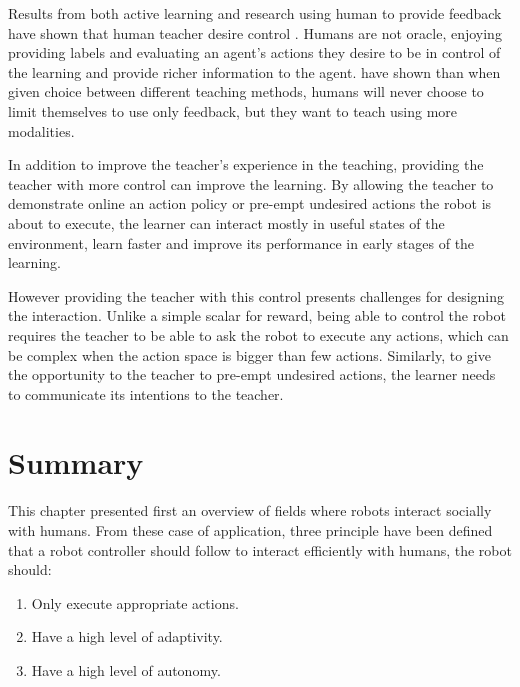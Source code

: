 Results from both active learning and research using human to provide feedback have shown that human teacher desire control \citep{amershi2014power}. Humans are not oracle, enjoying providing labels and evaluating an agent's actions they desire to be in control of the learning and provide richer information to the agent. \cite{kaochar2011towards} have shown than when given choice between different teaching methods, humans will never choose to limit themselves to use only feedback, but they want to teach using more modalities.

In addition to improve the teacher's experience in the teaching, providing the teacher with more control can improve the learning. By allowing the teacher to demonstrate online an action policy or pre-empt undesired actions the robot is about to execute, the learner can interact mostly in useful states of the environment, learn faster and improve its performance in early stages of the learning.

However providing the teacher with this control presents challenges for designing the interaction. Unlike a simple scalar for reward, being able to control the robot requires the teacher to be able to ask the robot to execute any actions,  which can be complex when the action space is bigger than few actions. Similarly, to give the opportunity to the teacher to pre-empt undesired actions, the learner needs to communicate its intentions to the teacher. %





\section{Summary}

This chapter presented first an overview of fields where robots interact socially with humans. From these case of application, three principle have been defined that a robot controller should follow to interact efficiently with humans, the robot should:
\begin{enumerate}
   	\item Only execute appropriate actions.
   	\item Have a high level of adaptivity.
   	\item Have a high level of autonomy.
\end{enumerate}

